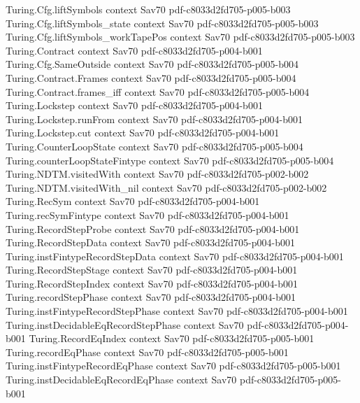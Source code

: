 \begin{theorem}
\proofstep
  {Turing.Cfg.liftSymbols}
  {context}
  {Sav70}
  {pdf-c8033d2fd705-p005-b003}
\proofstep
  {Turing.Cfg.liftSymbols_state}
  {context}
  {Sav70}
  {pdf-c8033d2fd705-p005-b003}
\proofstep
  {Turing.Cfg.liftSymbols_workTapePos}
  {context}
  {Sav70}
  {pdf-c8033d2fd705-p005-b003}
\proofstep
  {Turing.Contract}
  {context}
  {Sav70}
  {pdf-c8033d2fd705-p004-b001}
\proofstep
  {Turing.Cfg.SameOutside}
  {context}
  {Sav70}
  {pdf-c8033d2fd705-p005-b004}
\proofstep
  {Turing.Contract.Frames}
  {context}
  {Sav70}
  {pdf-c8033d2fd705-p005-b004}
\proofstep
  {Turing.Contract.frames_iff}
  {context}
  {Sav70}
  {pdf-c8033d2fd705-p005-b004}
\proofstep
  {Turing.Lockstep}
  {context}
  {Sav70}
  {pdf-c8033d2fd705-p004-b001}
\proofstep
  {Turing.Lockstep.runFrom}
  {context}
  {Sav70}
  {pdf-c8033d2fd705-p004-b001}
\proofstep
  {Turing.Lockstep.cut}
  {context}
  {Sav70}
  {pdf-c8033d2fd705-p004-b001}
\proofstep
  {Turing.CounterLoopState}
  {context}
  {Sav70}
  {pdf-c8033d2fd705-p005-b004}
\proofstep
  {Turing.counterLoopStateFintype}
  {context}
  {Sav70}
  {pdf-c8033d2fd705-p005-b004}
\proofstep
  {Turing.NDTM.visitedWith}
  {context}
  {Sav70}
  {pdf-c8033d2fd705-p002-b002}
\proofstep
  {Turing.NDTM.visitedWith_nil}
  {context}
  {Sav70}
  {pdf-c8033d2fd705-p002-b002}
\proofstep
  {Turing.RecSym}
  {context}
  {Sav70}
  {pdf-c8033d2fd705-p004-b001}
\proofstep
  {Turing.recSymFintype}
  {context}
  {Sav70}
  {pdf-c8033d2fd705-p004-b001}
\proofstep
  {Turing.RecordStepProbe}
  {context}
  {Sav70}
  {pdf-c8033d2fd705-p004-b001}
\proofstep
  {Turing.RecordStepData}
  {context}
  {Sav70}
  {pdf-c8033d2fd705-p004-b001}
\proofstep
  {Turing.instFintypeRecordStepData}
  {context}
  {Sav70}
  {pdf-c8033d2fd705-p004-b001}
\proofstep
  {Turing.RecordStepStage}
  {context}
  {Sav70}
  {pdf-c8033d2fd705-p004-b001}
\proofstep
  {Turing.RecordStepIndex}
  {context}
  {Sav70}
  {pdf-c8033d2fd705-p004-b001}
\proofstep
  {Turing.recordStepPhase}
  {context}
  {Sav70}
  {pdf-c8033d2fd705-p004-b001}
\proofstep
  {Turing.instFintypeRecordStepPhase}
  {context}
  {Sav70}
  {pdf-c8033d2fd705-p004-b001}
\proofstep
  {Turing.instDecidableEqRecordStepPhase}
  {context}
  {Sav70}
  {pdf-c8033d2fd705-p004-b001}
\proofstep
  {Turing.RecordEqIndex}
  {context}
  {Sav70}
  {pdf-c8033d2fd705-p005-b001}
\proofstep
  {Turing.recordEqPhase}
  {context}
  {Sav70}
  {pdf-c8033d2fd705-p005-b001}
\proofstep
  {Turing.instFintypeRecordEqPhase}
  {context}
  {Sav70}
  {pdf-c8033d2fd705-p005-b001}
\proofstep
  {Turing.instDecidableEqRecordEqPhase}
  {context}
  {Sav70}
  {pdf-c8033d2fd705-p005-b001}

\end{theorem}
